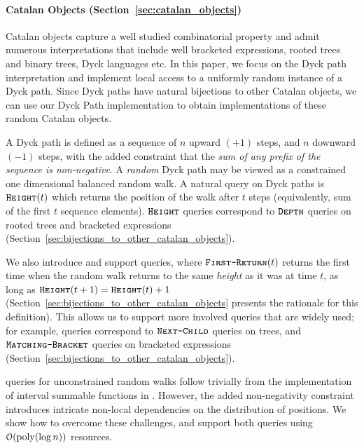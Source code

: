\paragraph*{Catalan Objects (Section~\ref{sec:catalan_objects})}%
\label{par:intro_catalan_objects}
Catalan objects capture a well studied combinatorial property and admit numerous interpretations that include
well bracketed expressions, rooted trees and binary trees, Dyck languages etc.
In this paper, we focus on the Dyck path interpretation and implement local access to a uniformly random instance of a Dyck path.
Since Dyck paths have natural bijections to other Catalan objects,
we can use our Dyck Path implementation to obtain implementations of these random Catalan objects.

A Dyck path is defined as a sequence of $n$ upward $(+1)$ steps, and $n$ downward $(-1)$ steps,
with the added constraint that the \emph{sum of any prefix of the sequence is non-negative}.
A \emph{random} Dyck path may be viewed as a constrained one dimensional balanced random walk.
A natural query on Dyck paths is $\texttt{\textsc{Height}}(t)$ which returns the position of the walk after $t$ steps
(equivalently, sum of the first $t$ sequence elements).
$\texttt{\textsc{Height}}$ queries correspond to $\texttt{\textsc{Depth}}$ queries on rooted trees and bracketed expressions
(Section~\ref{sec:bijections_to_other_catalan_objects}).

We also introduce and support  queries, where $\texttt{\textsc{First-Return}}(t)$ returns
the first time when the random walk returns to the same \emph{height} as it was at time $t$, as long as $\texttt{\textsc{Height}}(t+1)=\texttt{\textsc{Height}}(t)+1$
(Section~\ref{sec:bijections_to_other_catalan_objects} presents the rationale for this definition).
This allows us to support more involved queries that are widely used;
for example,  queries correspond to $\texttt{\textsc{Next-Child}}$ queries on trees,
and $\texttt{\textsc{Matching-Bracket}}$ queries on bracketed expressions (Section~\ref{sec:bijections_to_other_catalan_objects}).

 queries for unconstrained random walks follow trivially from the implementation of interval summable functions in \cite{huge, histogram}.
However, the added non-negativity constraint introduces intricate non-local dependencies on the distribution of positions.
We show how to overcome these challenges, and support both queries using $\mathcal O(\mathrm{poly}(\log n))$ resources.

